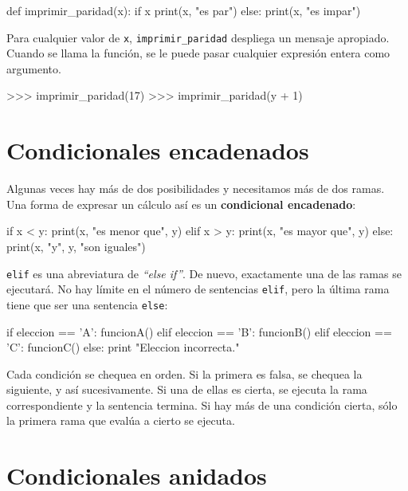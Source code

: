 \beforeverb
\begin{pythoncode}
def imprimir_paridad(x):
  if x %
    print(x, "es par")
  else:
    print(x, "es impar")
\end{pythoncode}
\afterverb
%

Para cualquier valor de \texttt{x}, \texttt{imprimir\_paridad} despliega
un mensaje apropiado. Cuando se llama la función, se le puede pasar
cualquier expresión entera como argumento.

\beforeverb
\begin{pyconcode}
>>> imprimir_paridad(17)
>>> imprimir_paridad(y + 1)
\end{pyconcode}
\afterverb
%

\section{Condicionales encadenados}

Algunas veces hay más de dos posibilidades y necesitamos más de dos 
ramas. Una forma de expresar un cálculo así es un  {\bf condicional encadenado}:

\beforeverb
\begin{pythoncode}
if x < y:
  print(x, "es menor que", y)
elif x > y:
  print(x, "es mayor que", y)
else:
  print(x, "y", y, "son iguales")
\end{pythoncode}
\afterverb
%

\texttt{elif} es una abreviatura de \textit{``else if''}. De nuevo, exactamente
una de las ramas se ejecutará. No hay límite en el número de sentencias 
\texttt{elif}, pero la última rama tiene que ser una sentencia \texttt{else}:

\beforeverb
\begin{pythoncode}
if eleccion == 'A':
  funcionA()
elif eleccion == 'B':
  funcionB()
elif eleccion == 'C':
  funcionC()
else:
  print "Eleccion incorrecta."
\end{pythoncode}
\afterverb
%

Cada condición se chequea en orden. Si la primera es falsa,
se chequea la siguiente, y así sucesivamente. Si una de ellas
es cierta, se ejecuta la rama correspondiente y la sentencia
termina. Si hay más de una condición cierta, sólo la primera
rama que evalúa a cierto se ejecuta.


\section{Condicionales anidados}


